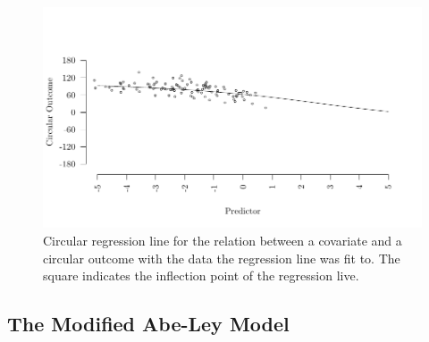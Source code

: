 \documentclass[man]{apa6}
\theoremstyle{definition}
\theoremstyle{definition}
\theoremstyle{definition}
\theoremstyle{remark}
\begin{document}
\begin{figure}[]
  \includegraphics[width = \textwidth]{Plots/circregline.pdf}
  \caption{Circular regression line for the relation between a covariate and a circular outcome with the data the regression line was fit to. The square indicates the inflection point of the regression live.}
  \label{circregline}
\end{figure}

\subsection{The Modified Abe-Ley Model}\label{WeiSSVM}
\end{document}

